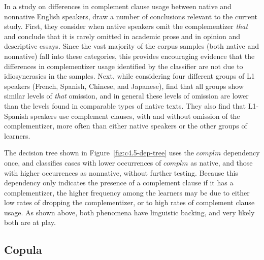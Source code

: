 \documentclass[main.tex]{subfiles}
\begin{document}
In a study on differences in complement clause usage between native and nonnative English speakers, \citet{biber:1998} draw a number of conclusions relevant to the current study. First, they consider when native speakers omit the complementizer \textit{that} and conclude that it is rarely omitted in academic prose and in opinion and descriptive essays. Since the vast majority of the corpus samples (both native and nonnative) fall into these categories, this provides encouraging evidence that the differences in complementizer usage identified by the classifier are not due to idiosyncrasies in the samples. Next, while considering four different groups of L1 speakers (French, Spanish, Chinese, and Japanese), \citeauthor{biber:1998} find that all groups show similar levels of \textit{that} omission, and in general these levels of omission are lower than the levels found in comparable types of native texts. They also find that L1-Spanish speakers use complement clauses, with and without omission of the complementizer, more often than either native speakers or the other groups of learners.

The decision tree shown in Figure~\ref{fig:c4.5-dep-tree} uses the $complm$ dependency once, and classifies cases with lower occurrences of $complm$ as native, and those with higher occurrences as nonnative, without further testing. Because this dependency only indicates the presence of a complement clause if it has a complementizer, the higher frequency among the learners may be due to either low rates of dropping the complementizer, or to high rates of complement clause usage. As shown above, both phenomena have linguistic backing, and very likely both are at play. 

\subsection{Copula}
\end{document}
